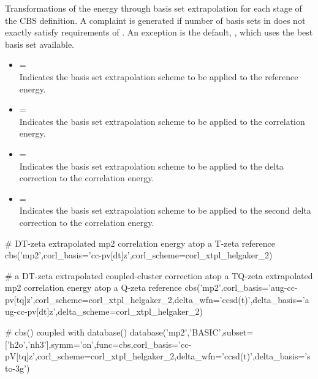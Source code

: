 \begin{itemize}
Transformations of the energy through basis set extrapolation for each stage of the CBS definition.
A complaint is generated if number of basis sets in  does not exactly satisfy
requirements of .
An exception is the default, , which uses the best basis set available.
\begin{itemize}
\item[]  = \textit{} \textbar\;  \\
Indicates the basis set extrapolation scheme to be applied to the reference energy.
\item[]  = \textit{} \textbar\;  \\
Indicates the basis set extrapolation scheme to be applied to the correlation energy.
\item[]  = \textit{} \textbar\;  \\
Indicates the basis set extrapolation scheme to be applied to the delta correction to the correlation energy.
\item[]  = \textit{} \textbar\;  \\
Indicates the basis set extrapolation scheme to be applied to the second delta correction to the correlation energy.
\end{itemize}
\end{itemize}


\begin{Snippet}
# DT-zeta extrapolated mp2 correlation energy atop a T-zeta reference
cbs('mp2',corl_basis='cc-pv[dt]z',corl_scheme=corl_xtpl_helgaker_2)

# a DT-zeta extrapolated coupled-cluster correction atop a TQ-zeta extrapolated mp2 correlation energy atop a Q-zeta reference
cbs('mp2',corl_basis='aug-cc-pv[tq]z',corl_scheme=corl_xtpl_helgaker_2,delta_wfn='ccsd(t)',delta_basis='aug-cc-pv[dt]z',delta_scheme=corl_xtpl_helgaker_2)

# cbs() coupled with database()
database('mp2','BASIC',subset=['h2o','nh3'],symm='on',func=cbs,corl_basis='cc-pV[tq]z',corl_scheme=corl_xtpl_helgaker_2,delta_wfn='ccsd(t)',delta_basis='sto-3g')

\end{Snippet}


